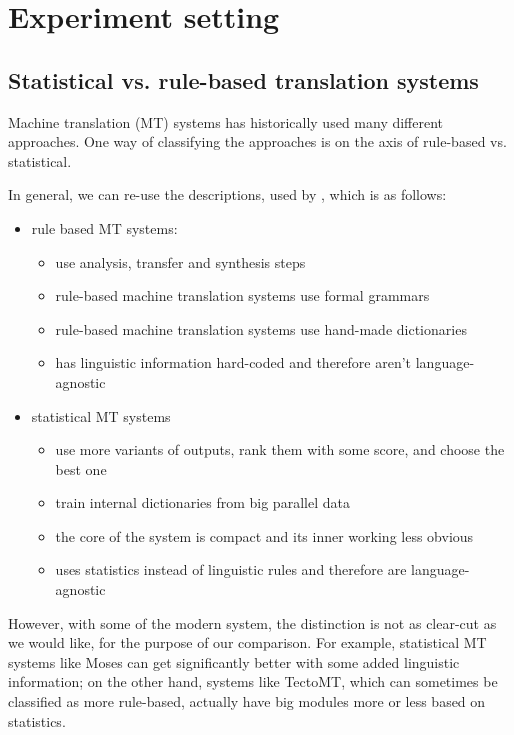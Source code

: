 \chapter{Experiment setting}
\section{Statistical vs. rule-based translation systems}

Machine translation (MT) systems has historically used many different approaches. One way of classifying the approaches is on the axis of rule-based vs. statistical.

In general, we can re-use the descriptions, used by \cite{bojar}, which is as follows:
\begin{itemize}
\item rule based MT systems:
\begin{itemize}
\item use analysis, transfer and synthesis steps
\item rule-based machine translation systems use formal grammars
\item rule-based machine translation systems use hand-made dictionaries
\item has linguistic information hard-coded and therefore aren't language-agnostic
\end{itemize}
\item statistical MT systems
\begin{itemize}
    \item use more variants of outputs, rank them with some score, and choose the best one
    \item train internal dictionaries from big parallel data
    \item the core of the system is compact and its inner working less obvious
    \item uses statistics instead of linguistic rules and therefore are language-agnostic
\end{itemize}
\end{itemize}

However, with some of the modern system, the distinction is not as clear-cut as we would like, for the purpose of our comparison. 
For example, statistical MT systems like Moses can get significantly better with some added linguistic information; 
on the other hand, systems like TectoMT, which can sometimes be classified as more rule-based, actually have big modules more or less based on statistics.

